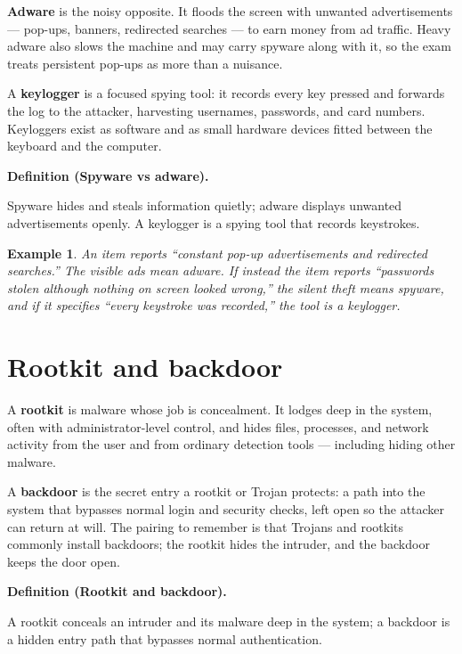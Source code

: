 \documentclass[11pt]{article}
\newtheorem{example}{Example}[section]
\newenvironment{definitionbox}[1]{%
  \par\noindent\textbf{Definition (#1).}\ \itshape
}{\par\vspace{0.3em}}
\begin{document}
\textbf{Adware} is the noisy opposite. It floods the screen with unwanted
advertisements --- pop-ups, banners, redirected searches --- to earn money
from ad traffic. Heavy adware also slows the machine and may carry spyware
along with it, so the exam treats persistent pop-ups as more than a
nuisance.

A \textbf{keylogger} is a focused spying tool: it records every key pressed
and forwards the log to the attacker, harvesting usernames, passwords, and
card numbers. Keyloggers exist as software and as small hardware devices
fitted between the keyboard and the computer.

\begin{definitionbox}{Spyware vs adware}
Spyware hides and steals information quietly; adware displays unwanted
advertisements openly. A keylogger is a spying tool that records keystrokes.
\end{definitionbox}

\begin{example}
An item reports ``constant pop-up advertisements and redirected searches.''
The visible ads mean adware. If instead the item reports ``passwords stolen
although nothing on screen looked wrong,'' the silent theft means spyware,
and if it specifies ``every keystroke was recorded,'' the tool is a
keylogger.
\end{example}

\section{Rootkit and backdoor}
A \textbf{rootkit} is malware whose job is concealment. It lodges deep in
the system, often with administrator-level control, and hides files,
processes, and network activity from the user and from ordinary detection
tools --- including hiding other malware.

A \textbf{backdoor} is the secret entry a rootkit or Trojan protects: a
path into the system that bypasses normal login and security checks, left
open so the attacker can return at will. The pairing to remember is that
Trojans and rootkits commonly install backdoors; the rootkit hides the
intruder, and the backdoor keeps the door open.

\begin{definitionbox}{Rootkit and backdoor}
A rootkit conceals an intruder and its malware deep in the system; a
backdoor is a hidden entry path that bypasses normal authentication.
\end{definitionbox}
\end{document}

